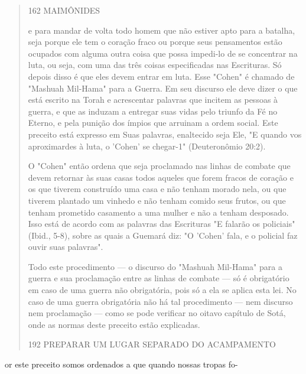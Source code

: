 \begin{quote}
162 MAIMÔNIDES

e para mandar de volta todo homem que não estiver apto para a batalha,
seja porque ele tem o coração fraco ou porque seus pensamentos estão
ocupados com alguma outra coisa que possa impedi-lo de se concentrar na
luta, ou seja, com uma das três coisas especificadas nas Escrituras. Só
depois disso é que eles devem entrar em luta. Esse "Cohen" é chamado de
"Mashuah Mil-Hama" para a Guerra. Em seu discurso ele deve dizer o que
está escrito na Torah e acres­centar palavras que incitem as pessoas à
guerra, e que as induzam a entregar suas vidas pelo triunfo da Fé no
Eterno, e pela punição dos ímpios que arrui­nam a ordem social. Este
preceito está expresso em Suas palavras, enaltecido seja Ele, "E quando
vos aproximardes à luta, o 'Cohen' se chegar-1" (Deutero­nômio 20:2).

O "Cohen" então ordena que seja proclamado nas linhas de comba­te que
devem retornar às suas casas todos aqueles que forem fracos de coração e
os que tiverem construído uma casa e não tenham morado nela, ou que
tive­rem plantado um vinhedo e não tenham comido seus frutos, ou que
tenham prometido casamento a uma mulher e não a tenham desposado. Isso
está de acordo com as palavras das Escrituras "E falarão os policiais"
(Ibid., 5-8), sobre as quais a Guemará diz: "O 'Cohen' fala, e o
policial faz ouvir suas palavras".

Todo este procedimento --- o discurso do "Mashuah Mil-Hama" pa­ra a
guerra e sua proclamação entre as linhas de combate --- só é obrigatório
em caso de uma guerra não obrigatória, pois só a ela se aplica esta lei.
No caso de uma guerra obrigatória não há tal procedimento --- nem
discurso nem pro­clamação --- como se pode verificar no oitavo capítulo
de Sotá, onde as nor­mas deste preceito estão explicadas.

192 PREPARAR UM LUGAR SEPARADO DO ACAMPAMENTO
\end{quote}

or este preceito somos ordenados a que quando nossas tropas fo-

